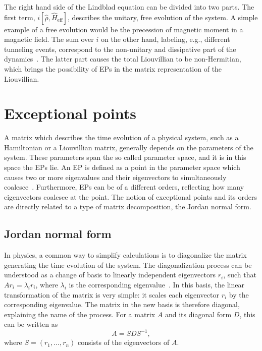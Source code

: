\documentclass[../main.tex]{subfiles}
\begin{document}
The right hand side of the Lindblad equation can be divided into two parts. The first term, $i[\hat\rho, \hat H_\text{eff}]$, describes the unitary, free evolution of the system. A simple example of a free evolution would be the precession of magnetic moment in a magnetic field. The sum over $i$ on the other hand, labeling, e.g., different tunneling events, correspond to the non-unitary and dissipative part of the dynamics~\cite{bookopen}. The latter part causes the total Liouvillian to be non-Hermitian, which brings the possibility of EPs in the matrix representation of the Liouvillian.


\section{Exceptional points}\label{sec:ep}
A matrix which describes the time evolution of a physical system, such as a Hamiltonian or a Liouvillian matrix, generally depends on the parameters of the system. These parameters span the so called parameter space, and it is in this space the EPs lie. An EP is defined as a point in the parameter space which causes two or more eigenvalues and their eigenvectors to simultaneously coalesce~\cite{nonHermrev}. Furthermore, EPs can be of a different orders, reflecting how many eigenvectors coalesce at the point. The notion of exceptional points and its orders are directly related to a type of matrix decomposition, the Jordan normal form.

\subsection{Jordan normal form}\label{sec:jordan}

In physics, a common way to simplify calculations is to diagonalize the matrix generating the time evolution of the system. The diagonalization process can be understood as a change of basis to linearly independent eigenvectors $r_i$, such that $Ar_i=\lambda_ir_i$, where $\lambda_i$ is the corresponding eigenvalue~\cite{uffe}. In this basis, the linear transformation of the matrix is very simple: it scales each eigenvector $r_i$ by the corresponding eigenvalue. The matrix in the new basis is therefore diagonal, explaining the name of the process. For a matrix $A$ and its diagonal form $D$, this can be written as 
\begin{equation}
    A = SDS^{-1},
\end{equation}
where $S = (r_1, \dots ,r_n)$ consists of the eigenvectors of $A$.
\end{document}
